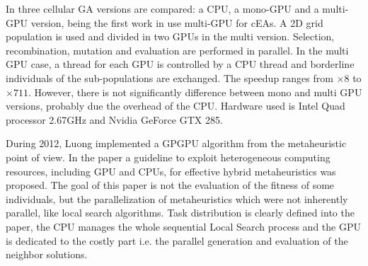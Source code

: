 \documentclass{article}
\begin{document}


In \cite{5586530} three cellular GA versions are compared: a CPU, a mono-GPU and a multi-GPU version, being the first work in use multi-GPU for cEAs. A 2D grid population is used and divided in two GPUs in the multi version. Selection, recombination, mutation and evaluation are performed in parallel. In the multi GPU case, a thread for each GPU is controlled by a CPU thread and borderline individuals of the sub-populations are exchanged. The speedup ranges from $\times8$ to $\times711$. However, there is not significantly difference between mono and multi GPU versions, probably due the overhead of the CPU. Hardware used is Intel Quad processor 2.67GHz and Nvidia GeForce GTX 285.

During 2012, Luong \cite{luongMetaheuristicsPpsn2012} implemented a GPGPU algorithm from the metaheuristic point of view. In the paper a guideline to exploit heterogeneous computing resources, including GPU and CPUs, for effective hybrid metaheuristics was proposed. The goal of this paper is not the evaluation of the fitness of some individuals, but the parallelization of metaheuristics which were not inherently parallel, like local search algorithms. Task distribution is clearly defined into the paper, the CPU manages the whole sequential Local Search process and the GPU is dedicated to the costly part i.e. the parallel generation and evaluation of the neighbor solutions.
\end{document}
